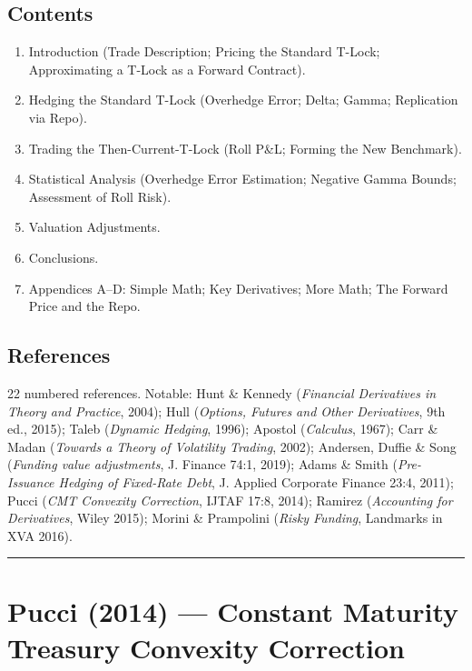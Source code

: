 \documentclass[11pt,a4paper]{article}
\begin{document}
\subsection*{Contents}
\begin{enumerate}[noitemsep]
  \item Introduction (Trade Description; Pricing the Standard T-Lock; Approximating a T-Lock as a Forward Contract).
  \item Hedging the Standard T-Lock (Overhedge Error; Delta; Gamma; Replication via Repo).
  \item Trading the Then-Current-T-Lock (Roll P\&L; Forming the New Benchmark).
  \item Statistical Analysis (Overhedge Error Estimation; Negative Gamma Bounds; Assessment of Roll Risk).
  \item Valuation Adjustments.
  \item Conclusions.
  \item Appendices A--D: Simple Math; Key Derivatives; More Math; The Forward Price and the Repo.
\end{enumerate}

\subsection*{References}
22 numbered references. Notable: Hunt \& Kennedy (\emph{Financial Derivatives in Theory and Practice}, 2004); Hull (\emph{Options, Futures and Other Derivatives}, 9th ed., 2015); Taleb (\emph{Dynamic Hedging}, 1996); Apostol (\emph{Calculus}, 1967); Carr \& Madan (\emph{Towards a Theory of Volatility Trading}, 2002); Andersen, Duffie \& Song (\emph{Funding value adjustments}, J. Finance 74:1, 2019); Adams \& Smith (\emph{Pre-Issuance Hedging of Fixed-Rate Debt}, J. Applied Corporate Finance 23:4, 2011); Pucci (\emph{CMT Convexity Correction}, IJTAF 17:8, 2014); Ramirez (\emph{Accounting for Derivatives}, Wiley 2015); Morini \& Prampolini (\emph{Risky Funding}, Landmarks in XVA 2016).

\bigskip\hrule\bigskip

\section{Pucci (2014) --- Constant Maturity Treasury Convexity Correction}
\label{bib:pucci-2014-cmt}
\end{document}

